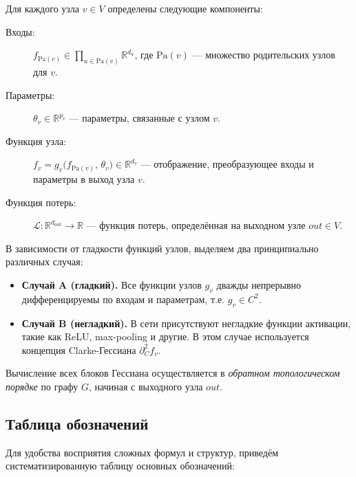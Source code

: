 \documentclass[11pt]{article}
\newcommand{\Pa}{\mathrm{Pa}} %
\begin{document}
Для каждого узла $v \in V$ определены следующие компоненты:
\begin{description}
  \item[Входы:] $f_{\Pa(v)}\in\prod_{u\in\Pa(v)}\mathbb{R}^{d_u}$, где $\Pa(v)$ — множество родительских узлов для $v$.
  \item[Параметры:] $\theta_v\in\mathbb{R}^{p_v}$ — параметры, связанные с узлом $v$.
  \item[Функция узла:] $f_v = g_v\bigl(f_{\Pa(v)},\,\theta_v\bigr)\in\mathbb{R}^{d_v}$ — отображение,
    преобразующее входы и параметры в выход узла $v$.
  \item[Функция потерь:] $\mathcal L:\mathbb{R}^{d_{out}}\to\mathbb{R}$ — функция потерь, определённая на
    выходном узле $out \in V$.
\end{description}

В зависимости от гладкости функций узлов, выделяем два принципиально различных случая:

\begin{itemize}
  \item \textbf{Случай A (гладкий).} Все функции узлов $g_v$ дважды непрерывно дифференцируемы по входам и
    параметрам, т.е. $g_v \in C^2$.
  \item \textbf{Случай B (негладкий).} В сети присутствуют негладкие функции активации, такие как ReLU,
    max-pooling и другие. В этом случае используется концепция Clarke-Гессиана $\partial_C^2 f_v$.
\end{itemize}

Вычисление всех блоков Гессиана осуществляется в \emph{обратном топологическом порядке} по графу $G$, начиная
с выходного узла $out$.

\subsection{Таблица обозначений}

Для удобства восприятия сложных формул и структур, приведём систематизированную таблицу основных обозначений:
\end{document}

